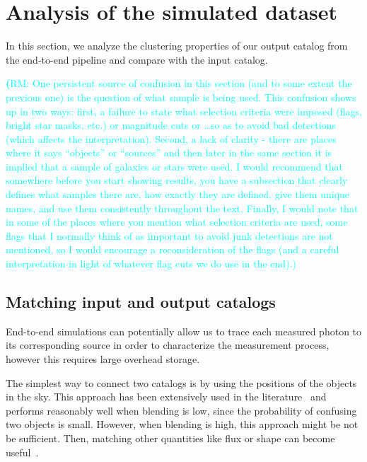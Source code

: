 \documentclass[twocolumn]{aastex62}
\newcommand{\rachel}[1]{{\textcolor{cyan}{{\textbf (RM: #1)}}}}
\begin{document}
\section{Analysis of the simulated dataset}
\label{sec:analysis}
In this section, we analyze the clustering properties of our output catalog from the end-to-end pipeline and compare with the input catalog.

\rachel{One persistent source of confusion in this section (and to some extent the previous one) is the question of what sample is being used.  This confusion shows up in two ways: first, a failure to state what selection criteria were imposed (flags, bright star masks, etc.) or magnitude cuts or \dots so as to avoid bad detections (which affects the interpretation).  Second, a lack of clarity - there are places where it says ``objects'' or ``sources'' and then later in the same section it is implied that a sample of galaxies or stars were used.  I would recommend that somewhere before you start showing results, you have a subsection that clearly defines what samples there are, how exactly they are defined, give them unique names, and use them consistently throughout the text.  Finally, I would note that in some of the places where you mention what selection criteria are used, some flags that I normally think of as important to avoid junk detections are not mentioned, so I would encourage a reconsideration of the flags (and a careful interpretation in light of whatever flag cuts we do use in the end).}

\subsection{Matching input and output catalogs}
\label{sec:matching}

End-to-end simulations can potentially allow us to trace each measured photon to its corresponding source in order to characterize the measurement process, however this requires large overhead storage. 


The simplest way to connect two catalogs is by using the positions of the objects in the sky. This approach has been extensively used in the literature~\citep{1977A&AS...28..211D,1983Obs...103..150B,1986MNRAS.223..279W} and performs reasonably well when blending is low, since the probability of confusing two objects is small. However, when blending is high, this approach might be not be sufficient. Then, matching other quantities like flux or shape can become useful~\citep{2008ApJ...679..301B}.
\end{document}

